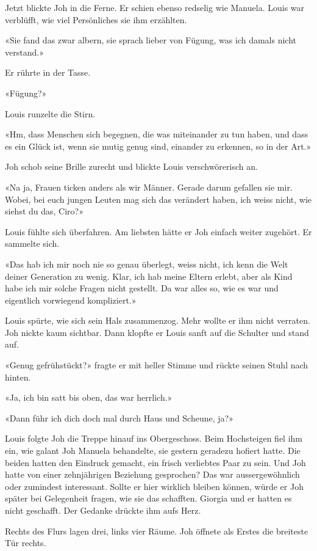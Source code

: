 Jetzt blickte Joh in die Ferne. Er schien ebenso redselig wie Manuela.
Louis war verblüfft, wie viel Persönliches sie ihm erzählten.

«Sie fand das zwar albern, sie sprach lieber von Fügung, was ich damals
nicht verstand.»

Er rührte in der Tasse.

«Fügung?»

Louis runzelte die Stirn.

«Hm, dass Menschen sich begegnen, die was miteinander zu tun haben, und
dass es ein Glück ist, wenn sie mutig genug sind, einander zu erkennen,
so in der Art.»

Joh schob seine Brille zurecht und blickte Louis verschwörerisch an.

«Na ja, Frauen ticken anders als wir Männer. Gerade darum gefallen sie
mir. Wobei, bei euch jungen Leuten mag sich das verändert haben, ich
weiss nicht, wie siehst du das, Ciro?»

Louis fühlte sich überfahren. Am liebsten hätte er Joh einfach weiter
zugehört. Er sammelte sich.

«Das hab ich mir noch nie so genau überlegt, weiss nicht, ich kenn die
Welt deiner Generation zu wenig. Klar, ich hab meine Eltern erlebt, aber
als Kind habe ich mir solche Fragen nicht gestellt. Da war alles so, wie
es war und eigentlich vorwiegend kompliziert.»

Louis spürte, wie sich sein Hals zusammenzog. Mehr wollte er ihm nicht
verraten. Joh nickte kaum sichtbar. Dann klopfte er Louis sanft auf die
Schulter und stand auf.

«Genug gefrühstückt?» fragte er mit heller Stimme und rückte seinen
Stuhl nach hinten.

«Ja, ich bin satt bis oben, das war herrlich.»

«Dann führ ich dich doch mal durch Haus und Scheune, ja?»

Louis folgte Joh die Treppe hinauf ins Obergeschoss. Beim Hochsteigen
fiel ihm ein, wie galant Joh Manuela behandelte, sie gestern geradezu
hofiert hatte. Die beiden hatten den Eindruck gemacht, ein frisch
verliebtes Paar zu sein. Und Joh hatte von einer zehnjährigen Beziehung
gesprochen? Das war aussergewöhnlich oder zumindest interessant. Sollte
er hier wirklich bleiben können, würde er Joh später bei Gelegenheit
fragen, wie sie das schafften. Giorgia und er hatten es nicht geschafft.
Der Gedanke drückte ihm aufs Herz.

Rechts des Flurs lagen drei, links vier Räume. Joh öffnete als Erstes
die breiteste Tür rechts.

